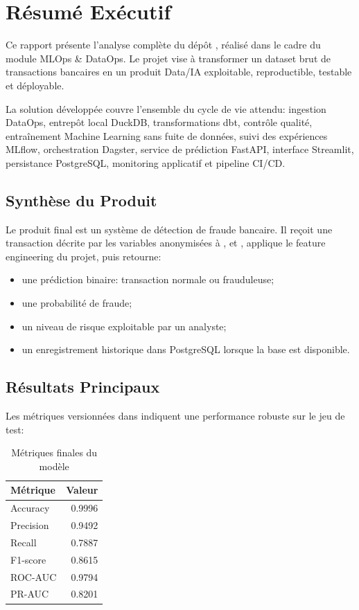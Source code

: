 \chapter{Résumé Exécutif}

Ce rapport présente l'analyse complète du dépôt , réalisé dans le cadre du module MLOps \& DataOps. Le projet vise à transformer un dataset brut de transactions bancaires en un produit Data/IA exploitable, reproductible, testable et déployable.

La solution développée couvre l'ensemble du cycle de vie attendu: ingestion DataOps, entrepôt local DuckDB, transformations dbt, contrôle qualité, entraînement Machine Learning sans fuite de données, suivi des expériences MLflow, orchestration Dagster, service de prédiction FastAPI, interface Streamlit, persistance PostgreSQL, monitoring applicatif et pipeline CI/CD.

\section{Synthèse du Produit}

Le produit final est un système de détection de fraude bancaire. Il reçoit une transaction décrite par les variables anonymisées  à ,  et , applique le feature engineering du projet, puis retourne:

\begin{itemize}
    \item une prédiction binaire: transaction normale ou frauduleuse;
    \item une probabilité de fraude;
    \item un niveau de risque exploitable par un analyste;
    \item un enregistrement historique dans PostgreSQL lorsque la base est disponible.
\end{itemize}

\section{Résultats Principaux}

Les métriques versionnées dans  indiquent une performance robuste sur le jeu de test:

\begin{table}[htbp]
\centering
\caption{Métriques finales du modèle}
\begin{tabular}{lr}
\toprule
Métrique & Valeur\\
\midrule
Accuracy & 0.9996\\
Precision & 0.9492\\
Recall & 0.7887\\
F1-score & 0.8615\\
ROC-AUC & 0.9794\\
PR-AUC & 0.8201\\
\bottomrule
\end{tabular}
\end{table}

